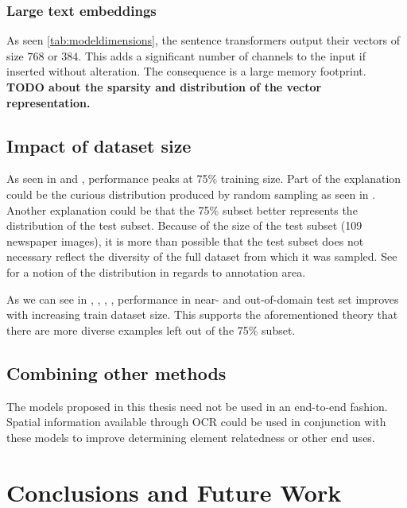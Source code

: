 \documentclass[oneside, english, bibtex]{kththesis}
\begin{document}
\subsection{Large text embeddings} 

As seen \autoref{tab:modeldimensions}, the sentence transformers output their vectors of size $768$ or $384$. This adds a significant number of channels to the input if inserted without alteration. The consequence is a large memory footprint. \textbf{TODO about the sparsity and distribution of the vector representation.}

\section{Impact of dataset size}

As seen in  and , performance peaks at 75\% training size. Part of the explanation could be the curious distribution produced by random sampling as seen in . Another explanation could be that the 75\% subset better represents the distribution of the test subset. Because of the size of the test subset (109 newspaper images), it is more than possible that the test subset does not necessary reflect the diversity of the full dataset from which it was sampled. See  for a notion of the distribution in regards to annotation area.

As we can see in , , , , performance in near- and out-of-domain test set improves with increasing train dataset size. This supports the aforementioned theory that there are more diverse examples left out of the 75\% subset.

\section{Combining other methods}

The models proposed in this thesis need not be used in an end-to-end fashion. Spatial information available through OCR could be used in conjunction with these models to improve determining element relatedness or other end uses. 

\chapter{Conclusions and Future Work}
\label{ch:conc}
\end{document}
